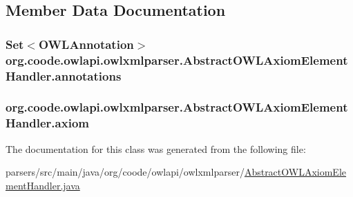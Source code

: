 \subsection{Member Data Documentation}
\hypertarget{classorg_1_1coode_1_1owlapi_1_1owlxmlparser_1_1_abstract_o_w_l_axiom_element_handler_a5573d5c3badd4182bd19c791420aea02}{
\subsubsection[{annotations}]{\setlength{\rightskip}{0pt plus 5cm}Set$<${\bf O\-W\-L\-Annotation}$>$ org.\-coode.\-owlapi.\-owlxmlparser.\-Abstract\-O\-W\-L\-Axiom\-Element\-Handler.\-annotations\hspace{0.3cm}{\ttfamily [private]}}}\label{classorg_1_1coode_1_1owlapi_1_1owlxmlparser_1_1_abstract_o_w_l_axiom_element_handler_a5573d5c3badd4182bd19c791420aea02}
\hypertarget{classorg_1_1coode_1_1owlapi_1_1owlxmlparser_1_1_abstract_o_w_l_axiom_element_handler_a170205bcdb1542a110951507e6047b4a}{
\subsubsection[{axiom}]{ org.\-coode.\-owlapi.\-owlxmlparser.\-Abstract\-O\-W\-L\-Axiom\-Element\-Handler.\-axiom\hspace{0.3cm}{\ttfamily [private]}}}\label{classorg_1_1coode_1_1owlapi_1_1owlxmlparser_1_1_abstract_o_w_l_axiom_element_handler_a170205bcdb1542a110951507e6047b4a}


The documentation for this class was generated from the following file\-:\begin{DoxyCompactItemize}
\item 
parsers/src/main/java/org/coode/owlapi/owlxmlparser/\hyperlink{_abstract_o_w_l_axiom_element_handler_8java}{Abstract\-O\-W\-L\-Axiom\-Element\-Handler.\-java}\end{DoxyCompactItemize}
